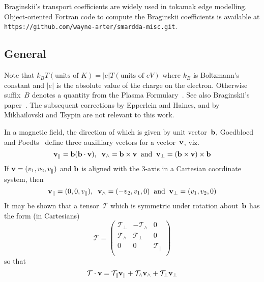 Braginskii's transport coefficients are widely used in tokamak edge modelling.
Object-oriented Fortran code to compute the Braginskii coefficients is available
at \\
{\tt https://github.com/wayne-arter/smardda-misc.git}.

\subsection{General}\label{sec:general}
Note that $k_B T(\mbox{units of }K) = |e| T(\mbox{units of }eV)$ where $k_B$ is Boltzmann's constant and $|e|$ is the
absolute value of the charge on the electron. Otherwise suffix~$B$ denotes a quantity
from the Plasma Formulary~\cite{NRLpf07}. See also Braginskii's paper~\cite{Br65Tranwarv}.
The subsequent corrections by Epperlein and Haines, and by Mikhailovski and Tsypin are not relevant to this work.

In a magnetic field, the direction of which is given by unit vector~${\bf b}$,
Goedbloed and Poedts~\cite{goedbloedpoedts} define three auxilliary vectors for
a vector~${\bf v}$, viz.
\begin{equation}\label{eq:vaux}
{\bf v}_{\parallel}= {\bf b} ({\bf b} \cdot {\bf v}), \;\; {\bf v}_\wedge= {\bf b} \times {\bf v}
\;\;\mbox{and}\;\; {\bf v}_\perp=({\bf b} \times {\bf v} ) \times {\bf b}
\end{equation}
If ${\bf v} = (v_1, v_2, v_\parallel)$ and ${\bf b}$ is aligned with the 3-axis
in a Cartesian coordinate system, then
\begin{equation}\label{eq:vpt}
{\bf v}_{\parallel}= (0,0,v_\parallel), \;\; {\bf v}_\wedge= (-v_2,v_1,0)
\;\;\mbox{and}\;\; {\bf v}_\perp=(v_1,v_2,0)
\end{equation}
It may be shown that a tensor~$\mathcal{T}$ which is symmetric under rotation
about~${\bf b}$ has the form (in Cartesians) 
\begin{equation}\label{eq:tensor}
\mathcal{T}=
\begin{pmatrix} \mathcal{T}_\perp & - \mathcal{T}_\wedge & 0 \\
 \mathcal{T}_\wedge &  \mathcal{T}_\perp & 0 \\
 0 & 0 & \mathcal{T}_\parallel \\
\end{pmatrix}
\end{equation}
so that
\begin{equation}\label{eq:TV}
\mathcal{T} \cdot {\bf v} = \mathcal{T}_\parallel {\bf v}_\parallel + \mathcal{T}_\wedge {\bf v}_\wedge + \mathcal{T}_\perp {\bf v}_\perp
\end{equation}

